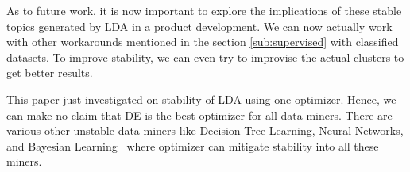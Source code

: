 \documentclass[conference]{IEEEtran}
\theoremstyle{break}
\begin{document}
As to future work, it is now important to explore the implications of these stable topics generated by LDA in a product development. We can now actually work with other workarounds mentioned in the section \ref{sub:supervised} with classified datasets. To improve stability, we can even try to improvise the actual clusters to get better results.

This paper just investigated on stability of LDA using one optimizer. Hence, we can make no claim that DE is the best optimizer for all data miners. There are various other unstable data miners like Decision Tree Learning, Neural Networks, and Bayesian Learning~\cite{zhang2005machine} where optimizer can mitigate stability into all these miners.

\medskip



\end{document}
